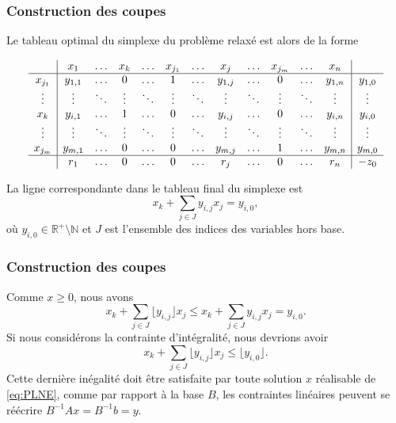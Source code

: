 \documentclass[usepdftitle=false]{beamer}
\def\cF{\mathcal{F}}
\begin{document}
\begin{frame}
\frametitle{Construction des coupes}

Le tableau optimal du simplexe du problème relaxé est alors de la forme
\begin{footnotesize}
$$
\begin{array}{c|ccccccccccc|c}
& x_1 & \ldots & x_k & \ldots & x_{j_1}& \ldots & x_j & \ldots & x_{j_m} & \ldots & x_n & \\
\hline
x_{j_1}& y_{1,1} & \ldots & 0 & \ldots & 1 & \ldots & y_{1,j} & \ldots & 0 & \ldots & y_{1,n} & y_{1,0} \\
\vdots & \vdots & \ddots & \vdots & \ddots & \vdots & \ddots & \vdots & \ddots & \vdots & \ddots & \vdots & \vdots \\
x_k & y_{i,1} & \ldots & 1 & \ldots & 0 & \ldots & y_{i,j} & \ldots & 0 & \ldots & y_{i,n} & y_{i,0} \\
\vdots & \vdots & \ddots & \vdots & \ddots & \vdots & \ddots & \vdots & \ddots & \vdots & \ddots & \vdots & \vdots \\
x_{j_m} & y_{m,1} & \ldots & 0 & \ldots & 0 & \ldots & y_{m,j} & \ldots & 1 & \ldots & y_{m,n} & y_{m,0} \\
\hline
& r_1 & \ldots & 0 & \ldots & 0 & \ldots & r_j & \ldots & 0 & \ldots & r_n & -z_0
\end{array}
$$
\end{footnotesize}

La ligne correspondante dans le tableau final du simplexe est
$$
x_k + \sum_{j \in J} y_{i,j}x_j = y_{i,0},
$$
où $y_{i,0} \in \mathbb{R}^+ \setminus \mathbb{N}$ et $J$ est l'ensemble des indices des variables hors base.

\end{frame}

\begin{frame}
\frametitle{Construction des coupes}

Comme $x \geq 0$, nous avons
$$
x_k + \sum_{j \in J} \lfloor y_{i,j} \rfloor x_j \leq x_k + \sum_{j \in J} y_{i,j}x_j = y_{i,0}.
$$
Si nous considérons la contrainte d'intégralité, nous devrions avoir
$$
x_k + \sum_{j \in J} \lfloor y_{i,j} \rfloor x_j \leq \lfloor y_{i,0} \rfloor.
$$
Cette dernière inégalité doit être satisfaite par toute solution $x$ réalisable de \eqref{eq:PLNE}, comme par rapport à la base $B$, les contraintes linéaires peuvent se réécrire $B^{-1}Ax = B^{-1}b = y$.

\end{frame}
\end{document}
